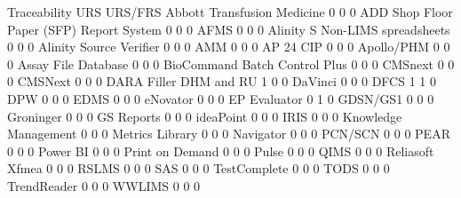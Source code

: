 \documentclass{article}
\begin{document}
\begin{Schunk}
\begin{Soutput}
                                           Traceability URS URS/FRS
  Abbott Transfusion Medicine                         0   0       0
  ADD Shop Floor Paper (SFP) Report System            0   0       0
  AFMS                                                0   0       0
  Alinity S Non-LIMS spreadsheets                     0   0       0
  Alinity Source Verifier                             0   0       0
  AMM                                                 0   0       0
  AP 24 CIP                                           0   0       0
  Apollo/PHM                                          0   0       0
  Assay File Database                                 0   0       0
  BioCommand Batch Control Plus                       0   0       0
  CMSnext                                             0   0       0
  CMSNext                                             0   0       0
  DARA Filler DHM and RU                              1   0       0
  DaVinci                                             0   0       0
  DFCS                                                1   1       0
  DPW                                                 0   0       0
  EDMS                                                0   0       0
  eNovator                                            0   0       0
  EP Evaluator                                        0   1       0
  GDSN/GS1                                            0   0       0
  Groninger                                           0   0       0
  GS Reports                                          0   0       0
  ideaPoint                                           0   0       0
  IRIS                                                0   0       0
  Knowledge Management                                0   0       0
  Metrics Library                                     0   0       0
  Navigator                                           0   0       0
  PCN/SCN                                             0   0       0
  PEAR                                                0   0       0
  Power BI                                            0   0       0
  Print on Demand                                     0   0       0
  Pulse                                               0   0       0
  QIMS                                                0   0       0
  Reliasoft Xfmea                                     0   0       0
  RSLMS                                               0   0       0
  SAS                                                 0   0       0
  TestComplete                                        0   0       0
  TODS                                                0   0       0
  TrendReader                                         0   0       0
  WWLIMS                                              0   0       0
                                          

\end{Soutput}
\end{Schunk}
\end{document}
